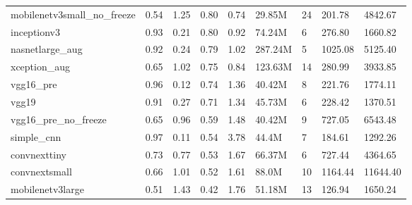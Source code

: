 \documentclass[10pt,a4paper,twocolumn,twoside]{article}
\begin{document}
\begin{table}[h]
\begin{tabular}{@{}lllllllll@{}}
  mobilenetv3small\_no\_freeze        & 0.54                    & 1.25                & 0.80                  & 0.74              & 29.85M          & 24              & 201.78                  & 4842.67           \\
  inceptionv3                         & 0.93                    & 0.21                & 0.80                  & 0.92              & 74.24M          & 6               & 276.80                  & 1660.82           \\
  nasnetlarge\_aug                    & 0.92                    & 0.24                & 0.79                  & 1.02              & 287.24M         & 5               & 1025.08                 & 5125.40           \\
  xception\_aug                       & 0.65                    & 1.02                & 0.75                  & 0.84              & 123.63M         & 14              & 280.99                  & 3933.85           \\
  vgg16\_pre                          & 0.96                    & 0.12                & 0.74                  & 1.36              & 40.42M          & 8               & 221.76                  & 1774.11           \\
  vgg19                               & 0.91                    & 0.27                & 0.71                  & 1.34              & 45.73M          & 6               & 228.42                  & 1370.51           \\
  vgg16\_pre\_no\_freeze              & 0.65                    & 0.96                & 0.59                  & 1.48              & 40.42M          & 9               & 727.05                  & 6543.48           \\
  simple\_cnn                         & 0.97                    & 0.11                & 0.54                  & 3.78              & 44.4M           & 7               & 184.61                  & 1292.26           \\
  convnexttiny                        & 0.73                    & 0.77                & 0.53                  & 1.67              & 66.37M          & 6               & 727.44                  & 4364.65           \\
  convnextsmall                       & 0.66                    & 1.01                & 0.52                  & 1.61              & 88.0M           & 10              & 1164.44                 & 11644.40          \\
  mobilenetv3large                    & 0.51                    & 1.43                & 0.42                  & 1.76              & 51.18M          & 13              & 126.94                  & 1650.24           \\

\end{tabular}
\end{table}
\end{document}
